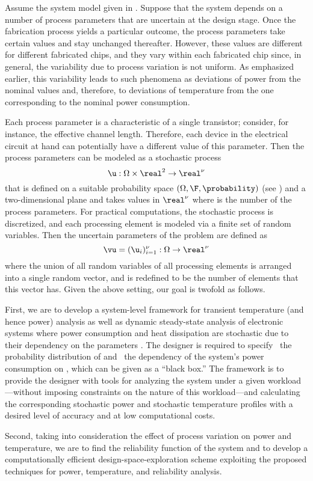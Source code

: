 Assume the system model given in . Suppose that the system
depends on a number of process parameters that are uncertain at the design
stage. Once the fabrication process yields a particular outcome, the process
parameters take certain values and stay unchanged thereafter. However, these
values are different for different fabricated chips, and they vary within each
fabricated chip since, in general, the variability due to process variation is
not uniform. As emphasized earlier, this variability leads to such phenomena as
deviations of power from the nominal values and, therefore, to deviations of
temperature from the one corresponding to the nominal power consumption.

Each process parameter is a characteristic of a single transistor; consider, for
instance, the effective channel length. Therefore, each device in the electrical
circuit at hand can potentially have a different value of this parameter. Then the
process parameters can be modeled as a stochastic process
\[
  \u: \Omega \times \real^2 \to \real^\nu
\]
that is defined on a suitable probability space $(\Omega, \F, \probability)$
(see ) and a two-dimensional plane and takes values in
$\real^\nu$ where \nu is the number of the process parameters. For practical
computations, the stochastic process is discretized, and each processing element
is modeled via a finite set of random variables. Then the uncertain parameters
of the problem are defined as
\[
  \vu = (\u_i)_{i = 1}^\nu: \Omega \to \real^\nu
\]
where the union of all random variables of all processing elements is arranged
into a single random vector, and \nu is redefined to be the number of elements
that this vector has. Given the above setting, our goal is twofold as follows.

First, we are to develop a system-level framework for transient temperature (and
hence power) analysis as well as dynamic steady-state analysis of electronic
systems where power consumption and heat dissipation are stochastic due to their
dependency on the parameters \vu. The designer is required to specify \one~the
probability distribution of \vu and \two~the dependency of the system's power
consumption on \vu, which can be given as a ``black box.'' The framework is to
provide the designer with tools for analyzing the system under a given
workload---without imposing constraints on the nature of this workload---and
calculating the corresponding stochastic power \mp and stochastic temperature
\mq profiles with a desired level of accuracy and at low computational costs.

Second, taking into consideration the effect of process variation on power and
temperature, we are to find the reliability function of the system and to
develop a computationally efficient design-space-exploration scheme exploiting
the proposed techniques for power, temperature, and reliability analysis.
